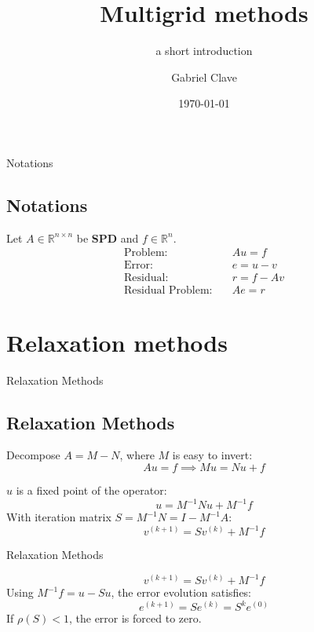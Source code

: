 \documentclass{beamer}
\title{Multigrid methods}
\subtitle{a short introduction}
\author{Gabriel Clave}
\date{\today}
\begin{document}
\frame{\titlepage}

\begin{frame}{Notations}
\subsection*{Notations}
Let $A \in \mathbb{R}^{n \times n}$ be \textbf{SPD} and $f \in \mathbb{R}^n$.
\begin{align*}
    \text{Problem:}          \quad & Au = f \\
    \text{Error:}            \quad & e = u - v \\
    \text{Residual:}         \quad & r = f - Av \\
    \text{Residual Problem:} \quad & Ae = r
\end{align*}
\end{frame}

\section{Relaxation methods}

\begin{frame}{Relaxation Methods}
\subsection*{Relaxation Methods}
Decompose $A = M - N$, where $M$ is easy to invert:
\[
    Au = f \implies Mu = Nu + f
\]

$u$ is a fixed point of the operator:
\[
    u = M^{-1}Nu + M^{-1}f
\]
With iteration matrix $S = M^{-1}N = I - M^{-1}A$:
\[
    v^{(k+1)} = Sv^{(k)} + M^{-1}f
\]
\end{frame}

\begin{frame}{Relaxation Methods}

\[
    v^{(k+1)} = Sv^{(k)} + M^{-1}f
\]
Using $M^{-1}f = u - Su$, the error evolution satisfies:
\[
    e^{(k+1)} = Se^{(k)} = S^{k}e^{(0)}
\]
If $\rho(S) < 1$, the error is forced to zero.
\end{frame}
\end{document}
